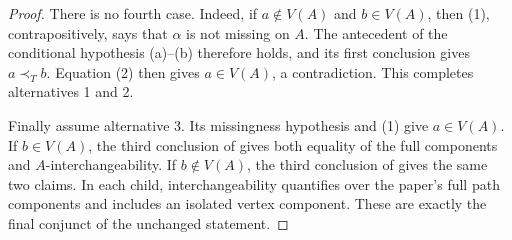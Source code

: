 \begin{proof}
There is no fourth case.  Indeed, if $a\notin V(A)$ and $b\in V(A)$,
then (1), contrapositively, says that $\alpha$ is not missing on $A$.
The antecedent of the conditional hypothesis (a)--(b) therefore holds,
and its first conclusion gives $a\prec_T b$.  Equation (2) then gives
$a\in V(A)$, a contradiction.  This completes alternatives 1 and 2.

Finally assume alternative 3.  Its missingness hypothesis and (1) give
$a\in V(A)$.  If $b\in V(A)$, the third conclusion of
 gives both equality of the full
components and $A$-interchangeability.  If $b\notin V(A)$, the third
conclusion of  gives the same two
claims.  In each child, interchangeability quantifies over the paper's
full path components and includes an isolated vertex component.  These
are exactly the final conjunct of the unchanged statement.
\end{proof}
